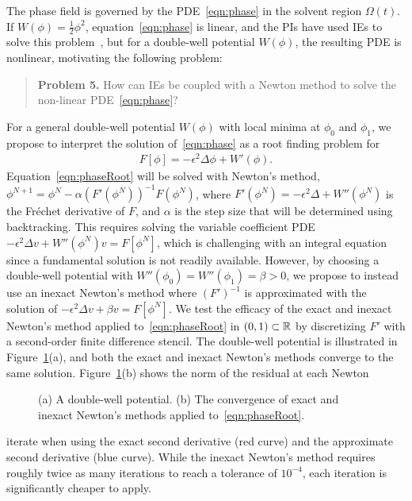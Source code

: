 The phase field is governed by the PDE~\eqref{eqn:phase} in the solvent
region $\Omega(t)$. If $W(\phi) = \tfrac{1}{2}\phi^2$,
equation~\eqref{eqn:phase} is linear, and the PIs have used IEs to solve
this problem~\cite{Fu2018_SIAM, FuQuRyYo22, fu-ryh-qua-you2022}, but for
a double-well potential $W(\phi)$, the resulting PDE is nonlinear,
motivating the following problem:

\begin{quotation}
  \noindent
  \textbf{Problem 5.} How can IEs be coupled with a Newton method to
  solve the non-linear PDE~\eqref{eqn:phase}?
\end{quotation}
For a general double-well potential $W(\phi)$ with local minima at
$\phi_0$ and $\phi_1$, we propose to interpret the solution
of~\eqref{eqn:phase} as a root finding problem for
\begin{align}
  \label{eqn:phaseRoot}
  F[\phi] = -\epsilon^2 \Delta \phi + W'(\phi).
\end{align}
Equation~\eqref{eqn:phaseRoot} will be solved with Newton's method,
$\phi^{N+1} = \phi^{N} - \alpha (F'(\phi^N))^{-1} F(\phi^N)$, where
$F'(\phi^N) = -\epsilon^2 \Delta + W''(\phi^N)$ is the Fr\'{e}chet
derivative of $F$, and $\alpha$ is the step size that will be determined
using backtracking. This requires solving the variable coefficient PDE
$-\epsilon^2 \Delta v + W''(\phi^{N}) v = F[\phi^N]$, which is
challenging with an integral equation since a fundamental solution is
not readily available. However, by choosing a double-well potential with
$W''(\phi_0) = W''(\phi_1) = \beta > 0$, we propose to instead use an
inexact Newton's method where $(F')^{-1}$ is approximated with the
solution of $-\epsilon^2 \Delta v + \beta v = F[\phi^N]$. We test the
efficacy of the exact and inexact Newton's method applied
to~\eqref{eqn:phaseRoot} in $(0,1) \subset \mathbb{R}$ by discretizing $F'$
with a second-order finite difference stencil. The double-well potential
is illustrated in Figure~\ref{fig:CA}(a), and both the exact and inexact
Newton's methods converge to the same solution. Figure~\ref{fig:CA}(b)
shows the norm of the residual at each Newton
\begin{figure}
  \vspace{-7pt}
  \centering
   
  \vspace{-10pt}
  \caption{\label{fig:CA} \footnotesize (a) A double-well potential. (b)
  The convergence of exact and inexact Newton's methods applied
  to~\eqref{eqn:phaseRoot}.}
\end{figure}
iterate when using the exact second derivative (red curve) and the
approximate second derivative (blue curve). While the inexact Newton's
method requires roughly twice as many iterations to reach a tolerance
of $10^{-4}$, each iteration is significantly cheaper to apply.

